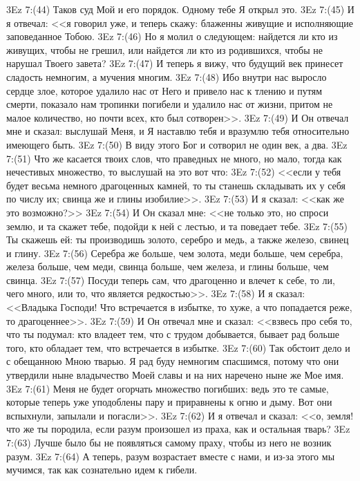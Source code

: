 \vs 3Ez 7:(44) Таков суд Мой и его порядок. Одному тебе Я открыл это.
\vs 3Ez 7:(45) И я отвечал: <<я говорил уже, и теперь скажу: блаженны живущие и исполняющие заповеданное Тобою.
\vs 3Ez 7:(46) Но я молил о следующем: найдется ли кто из живущих, чтобы не грешил, или найдется ли кто из родившихся, чтобы не нарушал Твоего завета?
\vs 3Ez 7:(47) И теперь я вижу, что будущий век принесет сладость немногим, а мучения многим.
\vs 3Ez 7:(48) Ибо внутри нас выросло сердце злое, которое удалило нас от Него и привело нас к тлению и путям смерти, показало нам тропинки погибели и удалило нас от жизни, притом не малое количество, но почти всех, кто был сотворен>>.
\vs 3Ez 7:(49) И Он отвечал мне и сказал: выслушай Меня, и Я наставлю тебя и вразумлю тебя относительно имеющего быть.
\vs 3Ez 7:(50) В виду этого Бог и сотворил не один век, а два.
\vs 3Ez 7:(51) Что же касается твоих слов, что праведных не много, но мало, тогда как нечестивых множество, то выслушай на это вот что:
\vs 3Ez 7:(52) <<если у тебя будет весьма немного драгоценных камней, то ты станешь складывать их у себя по числу их; свинца же и глины изобилие>>.
\vs 3Ez 7:(53) И я сказал: <<как же это возможно?>>
\vs 3Ez 7:(54) И Он сказал мне: <<не только это, но спроси землю, и та скажет тебе, подойди к ней с лестью, и та поведает тебе.
\vs 3Ez 7:(55) Ты скажешь ей: ты производишь золото, серебро и медь, а также железо, свинец и глину.
\vs 3Ez 7:(56) Серебра же больше, чем золота, меди больше, чем серебра, железа больше, чем меди, свинца больше, чем железа, и глины больше, чем свинца.
\vs 3Ez 7:(57) Посуди теперь сам, что драгоценно и влечет к себе, то ли, чего много, или то, что является редкостью>>.
\vs 3Ez 7:(58) И я сказал: <<Владыка Господи! Что встречается в избытке, то хуже, а что попадается реже, то драгоценнее>>.
\vs 3Ez 7:(59) И Он отвечал мне и сказал: <<взвесь про себя то, что ты подумал: кто владеет тем, что с трудом добывается, бывает рад больше того, кто обладает тем, что встречается в избытке.
\vs 3Ez 7:(60) Так обстоит дело и с обещанною Мною тварью. Я рад буду немногим спасшимся, потому что они утвердили ныне владычество Моей славы и на них наречено ныне же Мое имя.
\vs 3Ez 7:(61) Меня не будет огорчать множество погибших: ведь это те самые, которые теперь уже уподоблены пару и приравнены к огню и дыму. Вот они вспыхнули, запылали и погасли>>.
\vs 3Ez 7:(62) И я отвечал и сказал: <<о, земля! что же ты породила, если разум произошел из праха, как и остальная тварь?
\vs 3Ez 7:(63) Лучше было бы не появляться самому праху, чтобы из него не возник разум.
\vs 3Ez 7:(64) А теперь, разум возрастает вместе с нами, и из-за этого мы мучимся, так как сознательно идем к гибели.
